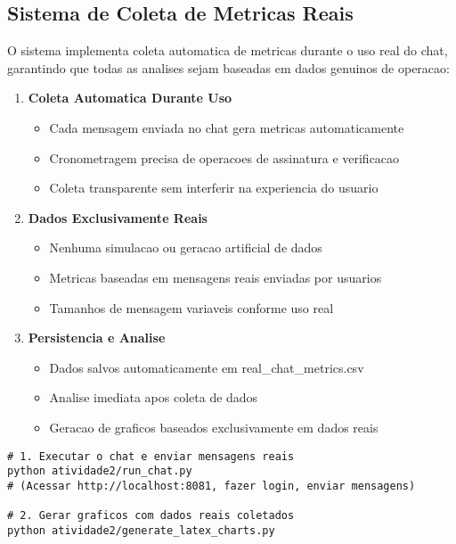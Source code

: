 \documentclass[12pt,a4paper,oneside]{article}
\begin{document}
\subsection{Sistema de Coleta de Metricas Reais}

O sistema implementa coleta automatica de metricas durante o uso real do chat, garantindo que todas as analises sejam baseadas em dados genuinos de operacao:

\begin{enumerate}
    \item \textbf{Coleta Automatica Durante Uso}
    \begin{itemize}
        \item Cada mensagem enviada no chat gera metricas automaticamente
        \item Cronometragem precisa de operacoes de assinatura e verificacao
        \item Coleta transparente sem interferir na experiencia do usuario
    \end{itemize}
    
    \item \textbf{Dados Exclusivamente Reais}
    \begin{itemize}
        \item Nenhuma simulacao ou geracao artificial de dados
        \item Metricas baseadas em mensagens reais enviadas por usuarios
        \item Tamanhos de mensagem variaveis conforme uso real
    \end{itemize}
    
    \item \textbf{Persistencia e Analise}
    \begin{itemize}
        \item Dados salvos automaticamente em real\_chat\_metrics.csv
        \item Analise imediata apos coleta de dados
        \item Geracao de graficos baseados exclusivamente em dados reais
    \end{itemize}
\end{enumerate}

\begin{lstlisting}[caption=Roteiro de execucao para coleta de dados reais]
# 1. Executar o chat e enviar mensagens reais
python atividade2/run_chat.py
# (Acessar http://localhost:8081, fazer login, enviar mensagens)

# 2. Gerar graficos com dados reais coletados
python atividade2/generate_latex_charts.py
\end{lstlisting}
\end{document}
